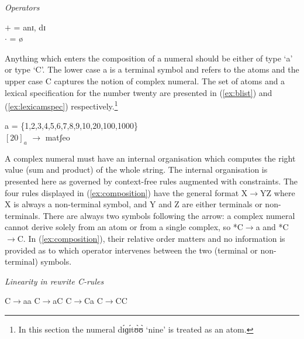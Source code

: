  \begin{exe} 
\ex\label{ex:operator}\textit{Operators}
\begin{xlist}
\ex\label{ex:operator+1}  $+$ = {anɪ, dɪ}\\
 
\ex\label{ex:operator-X}  $\cdot$ = {ø}
\end{xlist}
 \end{exe} 

Anything which enters the composition of a numeral should be either of type
 `{\W a}' or
type  `{\W C}'.  The lower case  {\W a} is a terminal symbol and refers to the 
atoms and the upper case {\W C} captures the
notion of  complex numeral.    The set
of
atoms  and a lexical specification for
the number twenty are presented in (\ref{ex:blist})  and (\ref{ex:lexicamspec})
respectively.\footnote{In this section the numeral {\F dɪ́ɡɪ́tʊ̀ʊ̀} `nine' is
treated as an
atom.} 

 \begin{exe}
\ex\label{ex:blist}  {\W a} = \{1,2,3,4,5,6,7,8,9,10,20,100,1000\}\\
\ex\label{ex:lexicamspec} $[20]_{a}$  $\rightarrow$  matʃeo
 \end{exe} 

A complex numeral must have an internal organisation
which computes the right value (sum and product) of the whole string. The
internal organisation is presented here as governed by context-free rules
augmented with constraints. The four rules displayed in (\ref{ex:composition})
have the general format X$\rightarrow$YZ where X is always a non-terminal
symbol, 
and Y and Z are either terminals or non-terminals. There are
always two symbols following the arrow: a complex numeral cannot derive solely
from an atom or from a single complex, so *{\W C}$\rightarrow${\W a} and
*{\W C}$\rightarrow${\W C}.  In
(\ref{ex:composition}),  their relative order matters and no information is
provided as to which operator intervenes between the two (terminal or
non-terminal) symbols.

 \begin{exe}
  \ex\label{ex:composition}\textit{Linearity in rewrite {\W C}-rules}
\begin{xlist}
\ex\label{ex:composition-bb} {\W C}$\rightarrow${\W aa} 
 \ex\label{ex:composition-bC} {\W C}$\rightarrow${\W aC}
\ex\label{ex:composition-Cb} {\W C}$\rightarrow${\W Ca}
\ex\label{ex:composition-CC} {\W C}$\rightarrow${\W CC}

\end{xlist}

 \end{exe}

